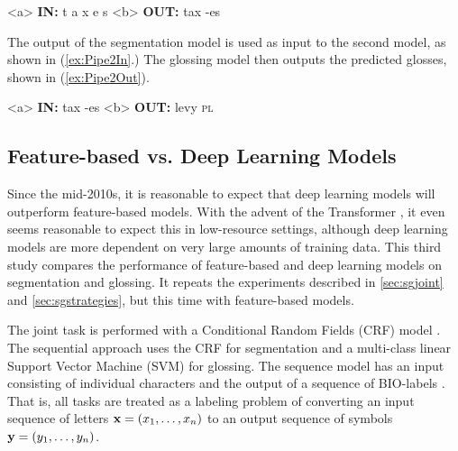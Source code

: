 \pex  
\label{ex:Pipe1InOut}
\a<a> \textbf{IN:} \hspace{6 mm} t \hspace{2 mm} a \hspace{2 mm} x \hspace{2 mm} e \hspace{2 mm} s 
\label{ex:Pipe1in}
\a<b> \textbf{OUT:} \hspace{2 mm} tax \hspace{3 mm} -es
\label{ex:Pipe1Out}
\xe

The output of the segmentation model is used as input to the second model, as shown in (\ref{ex:Pipe2In}.) The glossing model then outputs the predicted glosses, shown in (\ref{ex:Pipe2Out}). 

\pex  
\label{ex:Pipe2InOut}
\a<a> \textbf{IN:} \hspace{6 mm} tax \hspace{3 mm} -es
\label{ex:Pipe2In}
\a<b> \textbf{OUT:} \hspace{2 mm} levy \hspace{2 mm} \textsc{pl}
\label{ex:Pipe2Out}
\xe

\subsection{Feature-based vs. Deep Learning Models}
\label{sec:CRFvNN}

Since the mid-2010s, it is reasonable to expect that deep learning models will outperform feature-based models. With the advent of the Transformer \citep{vaswani_attention_2017}, it even seems reasonable to expect this in low-resource settings, although deep learning models are more dependent on very large amounts of training data. This third study compares the performance of feature-based and deep learning models on segmentation and glossing. It repeats the experiments described in \autoref{sec:sgjoint} and \autoref{sec:sgstrategies}, but this time with feature-based models.

The joint task is performed with a Conditional Random Fields (CRF) model \citep{lafferty_conditional_2001}. The sequential approach uses the CRF for segmentation and a multi-class linear Support Vector Machine (SVM) for glossing.
The sequence model has an input consisting of individual characters and the output of a sequence of BIO-labels \citep{ramshaw1999}. That is, all tasks are treated as a labeling problem of converting an input sequence of letters $\mathbf{x} = (x_1, \ldots, x_n)$ to an output sequence of symbols $\mathbf{y} = (y_1, \ldots, y_n)$.  

